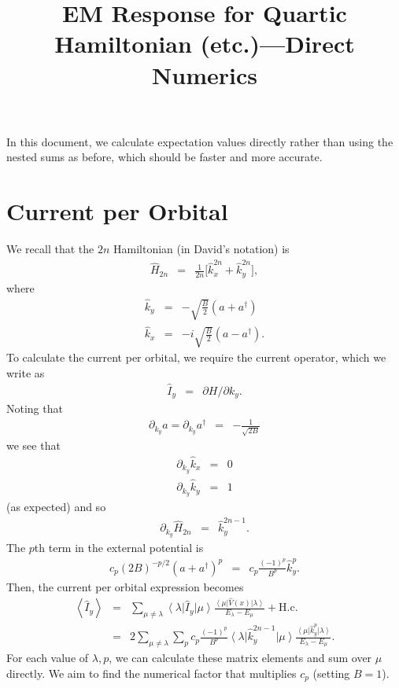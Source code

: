 \documentclass[a4paper, 10pt]{paper}
\newcommand{\be}{\begin{eqnarray*}}
\newcommand{\ee}{\end{eqnarray*}}
\newcommand{\h}{\hat{H}}
\newcommand{\ket}[1]{\left|{#1}\right\rangle}
\newcommand{\bra}[1]{\left\langle{#1}\right|}
\newcommand{\hc}{\mathrm{H.c.}}
\begin{document}
\title{EM Response for Quartic Hamiltonian (etc.)---Direct Numerics}
\maketitle
In this document, we calculate expectation values directly rather than using the nested sums as before, which should be faster and more accurate. 
\section{Current per Orbital}
We recall that the $2n$ Hamiltonian (in David's notation) is
\be
\h_{2n}&=&\frac{1}{2n}\bigg[\hat{k}_x^{2n}+\hat{k}_y^{2n}\bigg],
\ee
where
\be
\hat{k}_y&=&-\sqrt{\frac{B}{2}}\left(a+a^\dagger\right)\\
\hat{k}_x&=&-i\sqrt{\frac{B}{2}}\left(a-a^\dagger\right).
\ee
To calculate the current per orbital, we require the current operator, which we write as
\be
\hat{I}_y&=&\partial H/\partial k_y.
\ee
Noting that
\be
\partial_{k_y}a=\partial_{k_y}a^\dagger&=&-\frac{1}{\sqrt{2B}}
\ee
we see that
\be
\partial_{k_y}\hat{k}_x&=&0\\
\partial_{k_y}\hat{k}_y&=&1
\ee
(as expected) and so
\be
\partial_{k_y}\h_{2n}&=&\hat{k}_y^{2n-1}.
\ee
The $p$th term in the external potential is 
\be
c_p(2B)^{-p/2}\left(a+a^\dagger\right)^p&=&c_p\frac{(-1)^p}{B^p}\hat{k}_y^{p}.
\ee
Then, the current per orbital expression becomes
\be
\left\langle \hat{I}_y\right\rangle&=&\sum_{\mu\neq\lambda}\bra{\lambda}\hat{I}_y\ket{\mu}\frac{\bra{\mu}\hat{V}(x)\ket{\lambda}}{E_\lambda-E_\mu}+\hc\\
&=&2\sum_{\mu\neq\lambda}\sum_pc_p\frac{(-1)^p}{B^p}\bra{\lambda}\hat{k}_y^{2n-1}\ket{\mu}\frac{\bra{\mu}\hat{k}_y^p\ket{\lambda}}{E_\lambda-E_\mu}.
\ee
For each value of $\lambda,p$, we can calculate these matrix elements and sum over $\mu$ directly. We aim to find the numerical factor that multiplies $c_p$ (setting $B=1$).
\end{document}

